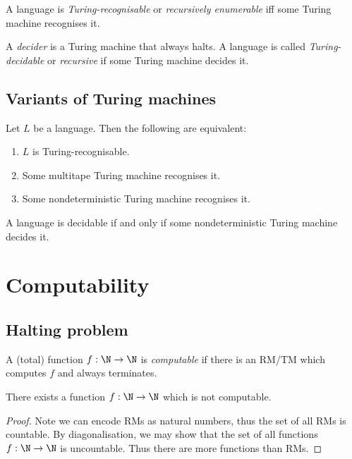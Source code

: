 \documentclass{article}
\begin{document}
\begin{definition*}
	A language is \emph{Turing-recognisable} or \emph{recursively enumerable}
	iff some Turing machine recognises it.
\end{definition*}

\begin{definition*}
	A \emph{decider} is a Turing machine that always halts. A language is called
	\emph{Turing-decidable} or \emph{recursive} if some Turing machine decides it.
\end{definition*}

\subsection{Variants of Turing machines}

\begin{theorem*}[Sipser p. 176-180]
	Let $L$ be a language. Then the following are equivalent:
	\begin{enumerate}
		\item $L$ is Turing-recognisable.
		\item Some multitape Turing machine recognises it.
		\item Some nondeterministic Turing machine recognises it.
	\end{enumerate}
\end{theorem*}

\begin{corollary*}[Sipser p. 180]
	A language is decidable if and only if some nondeterministic Turing machine
	decides it.
\end{corollary*}

\section{Computability}

\subsection{Halting problem}

\begin{definition*}
	A (total) function $f:\N\to\N$ is \emph{computable} if there is an RM/TM which
	computes $f$ and always terminates.
\end{definition*}

\begin{theorem*}
	There exists a function $f:\N\to\N$ which is not computable.
	\begin{proof}
		Note we can encode RMs as natural numbers, thus the set of all RMs is countable.
		By diagonalisation, we may show that the set of all functions $f:\N\to\N$ is
		uncountable. Thus there are more functions than RMs.
	\end{proof}
\end{theorem*}
\end{document}
